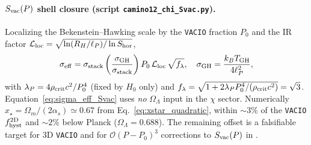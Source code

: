 \documentclass[prd,
               reprint,
               aps,
               preprintnumbers,
               nofootinbib,
               longbibliography,
               floatfix]{revtex4-2}
\begin{document}
\paragraph{$S_{\rm vac}(P)$ shell closure (script \texttt{camino12\_chi\_Svac.py}).}
Localizing the Bekenstein--Hawking scale by the \texttt{VACIO} fraction
$P_0$ and the IR factor
$\mathcal{L}_{\rm loc}=\sqrt{\ln(R_H/\ell_P)/\ln S_{\rm hor}}$,
\begin{equation}
\label{eq:sigma_eff_Svac}
\sigma_{\rm eff}
=
\sigma_{\rm stack}
\left(\frac{\sigma_{\rm GH}}{\sigma_{\rm stack}}\right)
P_0\,\mathcal{L}_{\rm loc}\,
\sqrt{f_\lambda},
\quad
\sigma_{\rm GH}=\frac{k_BT_{\rm GH}}{4\ell_P^2},
\end{equation}
with $\lambda_P=4\rho_{\rm crit}c^2/P_0^4$ (fixed by $H_0$ only) and
$f_\lambda=\sqrt{1+2\lambda_P P_0^4/(\rho_{\rm crit}c^2)}=\sqrt{3}$.
Equation~\eqref{eq:sigma_eff_Svac} uses \emph{no} $\Omega_\Lambda$ input
in the $\chi$ sector.
Numerically $x_\star=\Omega_m/(2\alpha_s)\simeq 0.67$ from
Eq.~\eqref{eq:xstar_quadratic}, within $\sim 3\%$ of the \texttt{VACIO}
$f_{\rm hyst}^{\rm 2D}$ and $\sim 2\%$ below Planck
($\Omega_\Lambda=0.688$).
The remaining offset is a falsifiable target for 3D \texttt{VACIO}
and for $\mathcal{O}(P-P_0)^3$ corrections to $S_{\rm vac}(P)$ in
\cite{gravedad3zenodo}.
\end{document}
